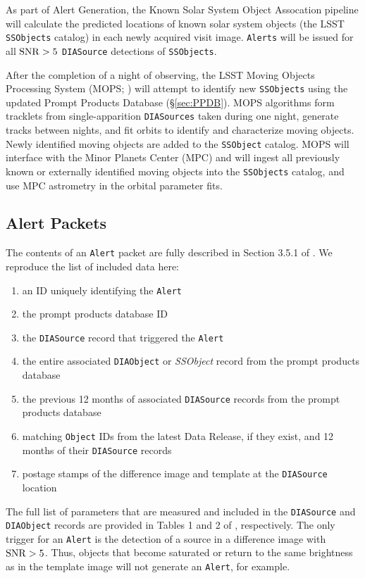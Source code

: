 As part of Alert Generation, the Known Solar System Object Assocation pipeline will calculate the predicted locations of known solar system objects (the LSST {\tt SSObjects} catalog) in each newly acquired visit image. 
{\tt Alerts} will be issued for all ${\rm SNR} > 5$ \texttt{DIASource} detections of \texttt{SSObjects}.

After the completion of a night of observing,
the LSST Moving Objects Processing System (MOPS; ) will attempt to identify new \texttt{SSObjects} using the updated Prompt Products Database (\S \ref{sec:PPDB}).
MOPS algorithms form tracklets from single-apparition \texttt{DIASources} taken during one night, generate tracks between nights, and fit orbits to identify and characterize moving objects.
Newly identified moving objects are added to the {\tt SSObject} catalog.
MOPS will interface with the Minor Planets Center (MPC) and will ingest all previously known or externally identified moving objects into the {\tt SSObjects} catalog, and use MPC astrometry in the orbital parameter fits.


\subsection{Alert Packets}\label{ssec:packets}

The contents of an {\tt Alert} packet are fully described in Section 3.5.1 of . We reproduce the list of included data here:
\renewcommand{\labelenumi}{\Roman{enumi}.}
\begin{enumerate}
\item an ID uniquely identifying the {\tt Alert}
\item the prompt products database ID
\item the {\tt DIASource} record that triggered the {\tt Alert}
\item the entire associated {\tt DIAObject} or {\it SSObject} record from the prompt products database
\item the previous 12 months of associated {\tt DIASource} records from the prompt products database
\item matching {\tt Object} IDs from the latest Data Release, if they exist, and 12 months of their {\tt DIASource} records
\item postage stamps of the difference image and template at the {\tt DIASource} location
\end{enumerate}

The full list of parameters that are measured and included in the {\tt DIASource} and {\tt DIAObject} records are provided in Tables 1 and 2 of , respectively.
The only trigger for an {\tt Alert} is the detection of a source in a difference image with ${\rm SNR} > 5$. 
Thus, objects that become saturated or return to the same brightness as in the template image will not generate an {\tt Alert}, for example.

